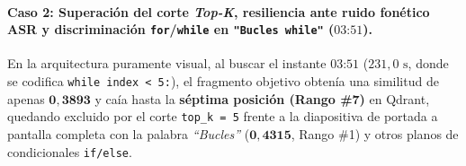\paragraph{Caso 2: Superación del corte \textit{Top-K}, resiliencia ante ruido fonético ASR y discriminación \texttt{for}/\texttt{while} en \texttt{"Bucles while"} ($03\text{:}51$).}
En la arquitectura puramente visual, al buscar el instante $03\text{:}51$ ($231,0\text{ s}$, donde se codifica \texttt{while index < 5:}), el fragmento objetivo obtenía una similitud de apenas $\mathbf{0,3893}$ y caía hasta la \textbf{séptima posición (Rango \#7)} en Qdrant, quedando excluido por el corte \texttt{top\_k = 5} frente a la diapositiva de portada a pantalla completa con la palabra \textit{``Bucles''} ($\mathbf{0,4315}$, Rango \#1) y otros planos de condicionales \texttt{if/else}. %

